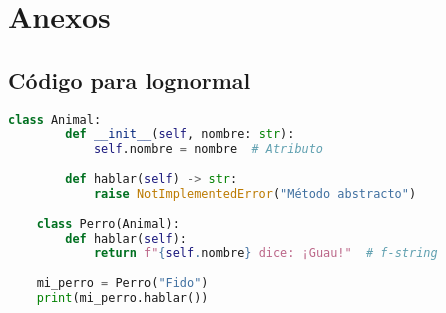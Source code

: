 \section{\Large Anexos}
\subsection{Código para lognormal}
\begin{lstlisting}[language=Python, caption={Ejemplo en Python: Clases}]
    class Animal:
        def __init__(self, nombre: str):
            self.nombre = nombre  # Atributo
        
        def hablar(self) -> str:
            raise NotImplementedError("Método abstracto")
    
    class Perro(Animal):
        def hablar(self):
            return f"{self.nombre} dice: ¡Guau!"  # f-string
    
    mi_perro = Perro("Fido")
    print(mi_perro.hablar())
\end{lstlisting}